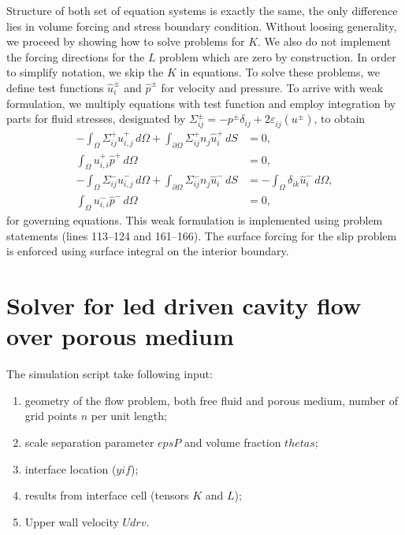 \documentclass[12pt,a4paper]{article}
\newcommand{\pd}{\partial}
\newcommand{\str}[3]{\varepsilon^{#1}_{#2} \left( #3 \right)}
\begin{document}
Structure of both set of equation systems is exactly the same, the only difference lies in volume forcing and stress boundary condition. Without loosing generality, we proceed by showing how to solve problems for $K$. We also do not implement the forcing directions for the $L$ problem which are zero by construction. In order to simplify notation, we skip the $K$ in equations. To solve these problems, we define test functions $\hat{u}_i^{\pm}$ and $\hat{p}^{\pm}$ for velocity and pressure. To arrive with weak formulation, we multiply equations with test function and employ integration by parts for fluid stresses, designated by $\Sigma^{\pm}_{ij} = - p^{\pm} \delta_{ij} + 2 \str{}{ij}{u^{\pm}} $, to obtain
\begin{align}
- \int_{\Omega} \Sigma^{+}_{ij} \hat{u}^{+}_{i,j} \,\mathit{d\Omega} + \int_{\pd \Omega} \Sigma^{+}_{ij} n_j \hat{u}^{+}_{i} \,\mathit{dS} & = 0, \\
\int_{\Omega} u^{{+}}_{i,i} \hat{p}^{+} \,\mathit{d\Omega} & = 0, \\
- \int_{\Omega} \Sigma^{-}_{ij} \hat{u}^{-}_{i,j} \,\mathit{d\Omega} + \int_{\pd \Omega} \Sigma^{-}_{ij} n_j \hat{u}^{-}_{i} \,\mathit{dS} & = -\int_{\Omega} \delta_{ik} \hat{u}^{-}_{i} \,\mathit{d\Omega},  \\
\int_{\Omega} u^{{-}}_{i,i} \hat{p}^{-} \,\mathit{d\Omega} & = 0,
\end{align}
for governing equations. This weak formulation is implemented using problem statements (lines 113--124 and 161--166). The surface
forcing for the slip problem is enforced using surface integral on the interior boundary.

\section{Solver for led driven cavity flow over porous medium}

The simulation script take following input:
\begin{enumerate}
    \item geometry of the flow problem, both free fluid and porous medium, number of grid points $n$ per unit length;
	\item scale separation parameter $epsP$ and volume fraction $thetas$;
    \item interface location ($yif$);
    \item results from interface cell (tensors $K$ and $L$);
    \item Upper wall velocity $Udrv$.
\end{enumerate}
\end{document}
